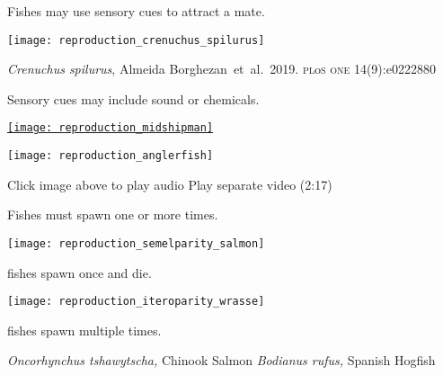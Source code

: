 \label{key}\documentclass[t]{beamer}
\begin{document}
\begin{frame}[t]{Fishes may use sensory cues to attract a mate.}

\centering
\texttt{[image: reproduction\_crenuchus\_spilurus]}

\vfilll

\tinyfill \textit{Crenuchus spilurus}, Almeida Borghezan~et~al.~2019. \textsc{pl}o{\textsc{s one} 14(9):e0222880}

\end{frame}

\begin{frame}[t]{Sensory cues may include sound or chemicals.}

\vspace*{-\baselineskip}

\begin{multicols}{2}

\href{https://dosits.org/galleries/audio-gallery/fishes/plainfin-midshipman/}{\texttt{[image: reproduction\_midshipman]}}

\columnbreak

\texttt{[image: reproduction\_anglerfish]}

\end{multicols}

\vfilll
\tiny Click image above to play audio \hfill Play separate video (2:17)

\end{frame}



\begin{frame}[t]{Fishes must spawn one or more times.}

\vspace*{-\baselineskip}

\begin{multicols}{2}

\texttt{[image: reproduction\_semelparity\_salmon]}

 fishes spawn once and die.

\columnbreak

\texttt{[image: reproduction\_iteroparity\_wrasse]}

 fishes spawn multiple times.

\end{multicols}

\vfilll

\tiny \textit{Oncorhynchus tshawytscha,} Chinook Salmon \hfill \textit{Bodianus rufus,} Spanish Hogfish

\end{frame}
\end{document}
